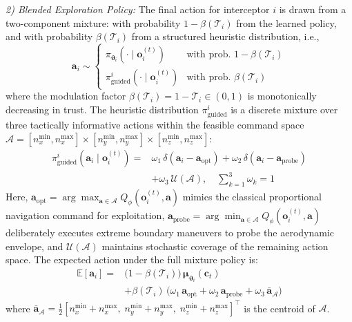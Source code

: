\documentclass[lettersize,journal]{IEEEtran}
\begin{document}
\emph{2) Blended Exploration Policy:} The final action for interceptor $i$ is drawn from a two-component mixture: with probability $1-\beta(\mathcal{T}_i)$ from the learned policy, and with probability $\beta(\mathcal{T}_i)$ from a structured heuristic distribution, i.e.,
\begin{equation}
\label{eq:exploration_policy}
\mathbf{a}_i \sim \begin{cases} \pi_{\boldsymbol{\vartheta}_i}(\cdot \mid \mathbf{o}_i^{(t)}) & \text{with prob. } 1 - \beta(\mathcal{T}_i) \\ \pi_{\mathrm{guided}}^{i}(\cdot \mid \mathbf{o}_i^{(t)}) & \text{with prob. } \beta(\mathcal{T}_i) \end{cases}
\end{equation}
where the modulation factor $\beta(\mathcal{T}_i) = 1 - \mathcal{T}_i \in (0,1)$ is monotonically decreasing in trust. The heuristic distribution $\pi_{\mathrm{guided}}^{i}$ is a discrete mixture over three tactically informative actions within the feasible command space $\mathcal{A} = [n_{x}^{\min},n_{x}^{\max}] \times [n_{y}^{\min},n_{y}^{\max}] \times [n_{z}^{\min},n_{z}^{\max}]$:
\begin{equation}
\label{eq:guided}
\begin{split}
\pi_{\mathrm{guided}}^{i}(\mathbf{a}_i \mid \mathbf{o}_i^{(t)}) =& \omega_1\,\delta(\mathbf{a}_i - \mathbf{a}_{\mathrm{opt}}) + \omega_2\,\delta(\mathbf{a}_i - \mathbf{a}_{\mathrm{probe}}) \\
&+ \omega_3\,\mathcal{U}(\mathcal{A}), \quad \sum_{k=1}^3\omega_k=1
\end{split}
\end{equation}
Here, $\mathbf{a}_{\mathrm{opt}} = \arg\max_{\mathbf{a} \in \mathcal{A}} Q_\phi(\mathbf{o}_i^{(t)}, \mathbf{a})$ mimics the classical proportional navigation command for exploitation, $\mathbf{a}_{\mathrm{probe}} = \arg\min_{\mathbf{a} \in \mathcal{A}} Q_\phi(\mathbf{o}_i^{(t)}, \mathbf{a})$ deliberately executes extreme boundary maneuvers to probe the aerodynamic envelope, and $\mathcal{U}(\mathcal{A})$ maintains stochastic coverage of the remaining action space. The expected action under the full mixture policy is:
\begin{equation}
\label{eq:expected_action}
\begin{split}
\mathbb{E}[\mathbf{a}_i] =& \bigl(1-\beta(\mathcal{T}_i)\bigr)\,\boldsymbol{\mu}_{\boldsymbol{\vartheta}_i}(\mathbf{c}_t) \\
&+ \beta(\mathcal{T}_i)\,\bigl(\omega_1\,\mathbf{a}_{\mathrm{opt}} + \omega_2\,\mathbf{a}_{\mathrm{probe}} + \omega_3\,\bar{\mathbf{a}}_{\mathcal{A}}\bigr)
\end{split}
\end{equation}
where $\bar{\mathbf{a}}_{\mathcal{A}} = \frac{1}{2}[n_x^{\min}+n_x^{\max},\;n_y^{\min}+n_y^{\max},\;n_z^{\min}+n_z^{\max}]^\top$ is the centroid of $\mathcal{A}$.
\end{document}
